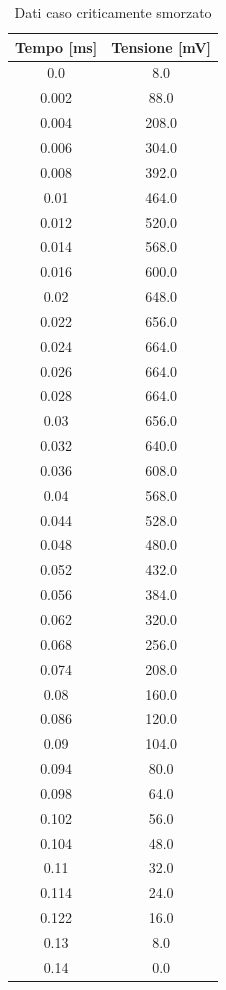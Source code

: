 \documentclass[letterpaper,12pt]{article}
\begin{document}
\begin{table}[htbp]
    \centering
    \caption{Dati caso criticamente smorzato}
    \begin{tabular}{cc}
        \toprule
        Tempo  [ms] & Tensione [mV] \\
        \midrule
        0.0 & 8.0 \\
        0.002 & 88.0 \\
        0.004 & 208.0 \\
        0.006 & 304.0 \\
        0.008 & 392.0 \\
        0.01 & 464.0 \\
        0.012 & 520.0 \\
        0.014 & 568.0 \\
        0.016 & 600.0 \\
        0.02 & 648.0 \\
        0.022 & 656.0 \\
        0.024 & 664.0 \\
        0.026 & 664.0 \\
        0.028 & 664.0 \\
        0.03 & 656.0 \\
        0.032 & 640.0 \\
        0.036 & 608.0 \\
        0.04 & 568.0 \\
        0.044 & 528.0 \\
        0.048 & 480.0 \\
        0.052 & 432.0 \\
        0.056 & 384.0 \\
        0.062 & 320.0 \\
        0.068 & 256.0 \\
        0.074 & 208.0 \\
        0.08 & 160.0 \\
        0.086 & 120.0 \\
        0.09 & 104.0 \\
        0.094 & 80.0 \\
        0.098 & 64.0 \\
        0.102 & 56.0 \\
        0.104 & 48.0 \\
        0.11 & 32.0 \\
        0.114 & 24.0 \\
        0.122 & 16.0 \\
        0.13 & 8.0 \\
        0.14 & 0.0 \\
        \bottomrule
    \end{tabular}
    \label{tab:dati_RLC_csm}
\end{table}
\end{document}
